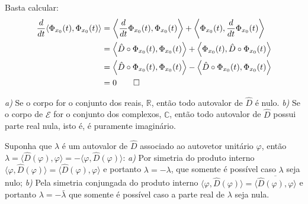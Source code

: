 \begin{prova}
   Basta calcular:
   $$\begin{aligned}
      \frac{d}{dt} \langle \Phi_{x_0}(t), \Phi_{x_0}(t) \rangle
      &= \left\langle \frac{d}{dt} \Phi_{x_0}(t), \Phi_{x_0}(t) \right\rangle +
         \left\langle \Phi_{x_0}(t), \frac{d}{dt} \Phi_{x_0}(t) \right\rangle \\
      &= \left\langle \hat{D} \circ \Phi_{x_0}(t), \Phi_{x_0}(t) \right\rangle +
         \left\langle \Phi_{x_0}(t), \hat{D} \circ \Phi_{x_0}(t) \right\rangle \\
      &= \left\langle \hat{D} \circ \Phi_{x_0}(t), \Phi_{x_0}(t) \right\rangle -
         \left\langle \hat{D} \circ \Phi_{x_0}(t), \Phi_{x_0}(t) \right\rangle \\
      &= 0 \qedhere
   \end{aligned}$$
\end{prova}

\begin{teorema}
   \textit{a)}
      Se o corpo for o conjunto dos reais, $\mathbb{R}$,
      então todo autovalor de $\hat{D}$ é nulo.
   \textit{b)}
      Se o corpo de $\mathcal{E}$ for o conjunto dos complexos, $\mathbb{C}$,
      então todo autovalor de $\hat{D}$ possui parte real nula,
      isto é, é puramente imaginário.
\end{teorema}

\begin{prova}
   Suponha que $\lambda$ é um autovalor de $\hat{D}$ associado ao autovetor
   unitário $\varphi$, então
   $
      {\lambda} =
      {\langle \hat{D}(\varphi), \varphi \rangle} =
      {- \langle \varphi, \hat{D}(\varphi) \rangle}
   $:
   \textit{a)}
      Por simetria do produto interno
      $
         {\langle \varphi, \hat{D}(\varphi) \rangle} =
         {\langle \hat{D}(\varphi), \varphi \rangle}
      $
      e portanto $\lambda = -\lambda$,
      que somente é possível caso $\lambda$ seja nulo;
   \textit{b)}
      Pela simetria conjungada do produto interno
      $
         {\langle \varphi, \hat{D}(\varphi) \rangle} =
         \overline{\langle \hat{D}(\varphi), \varphi \rangle}
      $
      e portanto $\lambda = - \bar{\lambda}$
      que somente é possível caso a parte real de $\lambda$ seja nula.
\end{prova}

